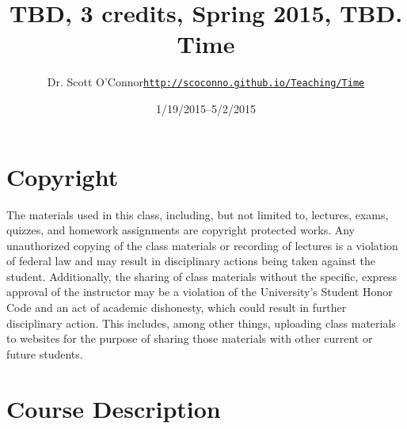\documentclass[article,oneside]{memoir}
\def\myauthor{Author}
\def\mytitle{Title}
\def\mycopyright{\myauthor}
\def\myweb{\href{http://scoconno.github.io/Teaching/Time}{http://scoconno.github.io/Teaching/Time}}
\def\myauthor{Dr. Scott O'Connor}
\def\mytitle{{\normalsize TBD, 3 credits, Spring 2015, TBD. \newline} \HUGE Time}
\begin{document}
\setsansfont[Mapping=tex-text]{Myriad Pro} 
\setmonofont[Mapping=tex-text,Scale=0.8]{Georgia} 

\def\ind{\hangindent=1 true cm\hangafter=1 \noindent}
\def\labelitemi{$\cdot$}


\title{\LARGE \mytitle}     
\author{\Large\myauthor \newline \footnotesize\texttt{\noindent\myweb}}
\date{1/19/2015--5/2/2015}

\published{\today}

\maketitle




%
%

\section{Copyright}
The materials used in this class, including, but not limited to, lectures, exams, quizzes, and homework assignments are copyright protected works.  Any unauthorized copying of the class materials or recording of lectures is a violation of federal law and may result in disciplinary actions being taken against the student.  Additionally, the sharing of class materials without the specific, express approval of the instructor may be a violation of the University's Student Honor Code and an act of academic dishonesty, which could result in further disciplinary action.  This includes, among other things, uploading class materials to websites for the purpose of sharing those materials with other current or future students. 



\section{Course Description}
\end{document}
